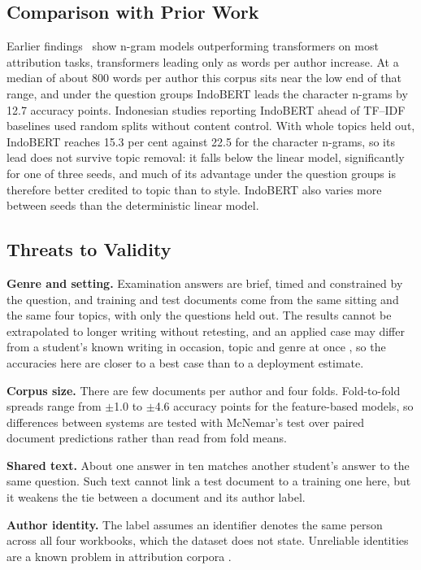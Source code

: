 \documentclass[conference]{IEEEtran}
\begin{document}
\subsection{Comparison with Prior Work}

Earlier findings~\cite{Tyo2022} show n-gram models outperforming transformers on most attribution tasks, transformers leading only as words per author increase. At a median of about 800 words per author this corpus sits near the low end of that range, and under the question groups IndoBERT leads the character n-grams by 12.7 accuracy points. Indonesian studies reporting IndoBERT ahead of TF--IDF baselines \cite{Saputra2023,Saputra2024} used random splits without content control. With whole topics held out, IndoBERT reaches 15.3 per cent against 22.5 for the character n-grams, so its lead does not survive topic removal: it falls below the linear model, significantly for one of three seeds, and much of its advantage under the question groups is therefore better credited to topic than to style. IndoBERT also varies more between seeds than the deterministic linear model.

\subsection{Threats to Validity}

\textbf{Genre and setting.} Examination answers are brief, timed and constrained by the question, and training and test documents come from the same sitting and the same four topics, with only the questions held out. The results cannot be extrapolated to longer writing without retesting, and an applied case may differ from a student's known writing in occasion, topic and genre at once \cite{Barlas2021}, so the accuracies here are closer to a best case than to a deployment estimate.

\textbf{Corpus size.} There are few documents per author and four folds. Fold-to-fold spreads range from $\pm$1.0 to $\pm$4.6 accuracy points for the feature-based models, so differences between systems are tested with McNemar's test over paired document predictions rather than read from fold means.

\textbf{Shared text.} About one answer in ten matches another student's answer to the same question. Such text cannot link a test document to a training one here, but it weakens the tie between a document and its author label.

\textbf{Author identity.} The label assumes an identifier denotes the same person across all four workbooks, which the dataset does not state. Unreliable identities are a known problem in attribution corpora \cite{Bogomolov2021}.
\end{document}
